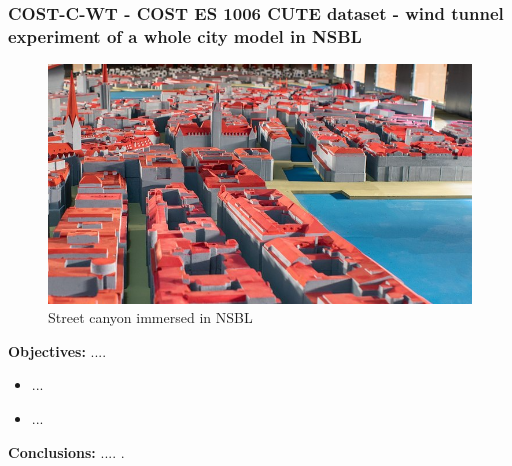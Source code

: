 \subsubsection{COST-C-WT - COST ES 1006 CUTE dataset - wind tunnel experiment of a whole city model in NSBL}
    \begin{figure}[h!]
        \hypertarget{link:cost_c_wt}{}
        \centering
        \includegraphics[scale=0.6]{imgs/cute.jpg}
        \caption{Street canyon immersed in NSBL}
    \end{figure}
    \textbf{Objectives:} ....\newline
    \begin{itemize}
        \item ...
        \item ...
    \end{itemize}
    \textbf{Conclusions:} .... .\newline

